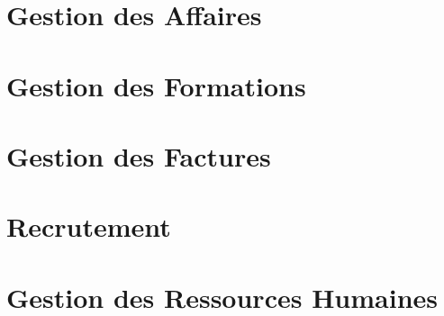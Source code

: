 \documentclass[12pt]{scrreprt}
\begin{document}
\chapter{Gestion des Affaires}


\chapter{Gestion des Formations}


\chapter{Gestion des Factures}

\chapter{Recrutement}


\chapter{Gestion des Ressources Humaines}

\end{document}
